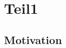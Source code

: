 \documentclass[ 11pt
				,ngerman
				,headsepline
				,headings=small
				,numbers=noenddot %
				,draft=false
				,BCOR=0mm %
				,DIV=12
				,captions=tableheading
				,paper=a4
				,abstracton
                ]{scrreprt}
\begin{document}
\pagestyle{empty}


\newpage
{}
\pagestyle{fancy}\lhead{\leftmark}\chead{}\rhead{\rightmark}
\rhead{\rightmark}
\lhead{\leftmark}

\chapter{Teil1}
\label{cha:Teil1}
\section{Motivation}
\label{sec:Motivation}
\end{document}
